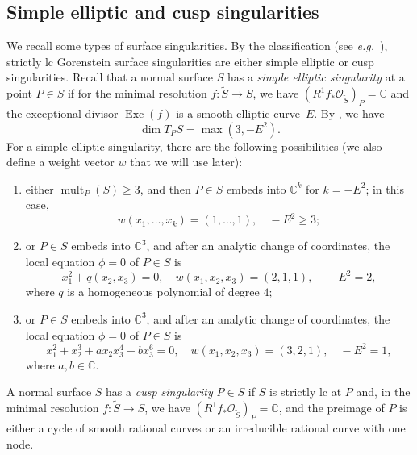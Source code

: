 \documentclass[11pt]{amsart}
\numberwithin{equation}{section}
\theoremstyle{definition}
\theoremstyle{remark}
\newcommand{\OOO}{\mathscr{O}}
\DeclareMathOperator{\Exc}{Exc}
\DeclareMathOperator{\mult}{mult}
\begin{document}
\subsection{Simple elliptic and cusp singularities}
\label{subsec-simple-ell-cusp}
We recall some types of surface singularities.
By the classification (see \textit{e.g.}~\cite[Section~4.4]{KM98}),
strictly lc Gorenstein surface singularities are either simple elliptic or cusp singularities. 
\label{subsec-cusp-elliptic}
Recall that a normal surface $S$ has a \emph{simple elliptic singularity} at a point $P\in S$ if for the minimal resolution $f\colon \widetilde{S}\to S$, we have $(R^1f_*\OOO_{\widetilde{S}})_P=\mathbb{C}$ and the exceptional divisor $\Exc(f)$ is a smooth elliptic curve~$E$.  
By \cite[Proposition~4.54]{KM98}, we have 
\begin{equation}
\label{eq-elliptic-curve-embedding-dimension}
\dim T_P S = \max(3, -E^2). 
\end{equation}
For a simple elliptic singularity, there are the following possibilities (we also define a weight vector $w$ that we will use later): 
\begin{enumerate}
\item
  either $\mult_P(S)\geq 3$,
  and then $P\in S$ embeds into $\mathbb{C}^k$ for $k=-E^2$; in this case,  
\begin{equation}
\label{eq-simple-elliptic-sing-0}
w(x_1,\ldots,x_k)=(1,\ldots,1),  \quad -E^2\geq 3; 
\end{equation}
\item
or $P\in S$ embeds into $\mathbb{C}^3$, and after an analytic change of coordinates, the local equation $\phi=0$ of $P\in S$ is
\begin{equation}
\label{eq-simple-elliptic-sing-1}
x_1^2 + q(x_2, x_3) = 0,  \quad w(x_1,x_2,x_3)=(2,1,1),  \quad -E^2=2, 
\end{equation}
where $q$ is a homogeneous polynomial of degree $4$; 
\item
or $P\in S$ embeds into $\mathbb{C}^3$, and after an analytic change of coordinates,  the local equation $\phi=0$ of $P\in S$ is
\begin{equation}
\label{eq-simple-elliptic-sing-2}
x_1^2+x_2^3+ax_2x_3^4+bx_3^6=0,  \quad w(x_1,x_2,x_3)=(3,2,1),  \quad -E^2=1, 
\end{equation}
where $a,b\in\mathbb{C}$. 
\end{enumerate}

\label{hypersurface-cusp-sing}
A normal surface $S$ has a \emph{cusp singularity} $P\in S$ if $S$ is strictly lc at $P$ and, in the minimal resolution $f\colon \widetilde{S}\to S$, we have $(R^1f_*\OOO_{\widetilde{S}})_P=\mathbb{C}$, and the preimage of $P$ is either a cycle of smooth rational curves or an irreducible rational curve with one node. 
\end{document}
